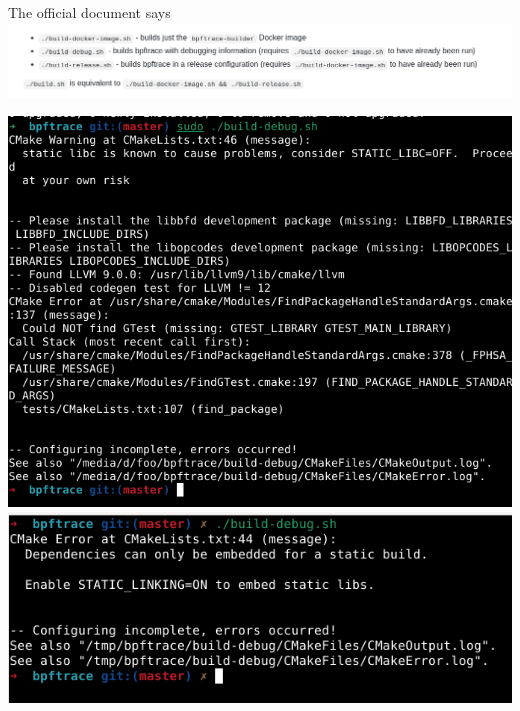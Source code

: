 \documentclass{beamer}
\begin{document}
\begin{CJK*}{UTF8}{bsmi}
  \begin{frame}{The official document says}
    \includegraphics[width=\textwidth]{Screenshot_2021-08-06_06-50-18.png}
    \begin{multicols*}{2}
      \includegraphics[height=.6\textheight]{C86IdNH.png}
      \includegraphics[height=.6\textheight]{Screenshot_2021-08-06_07-00-24.png}  
    \end{multicols*}
    
  \end{frame}


\end{CJK*}
\end{document}
